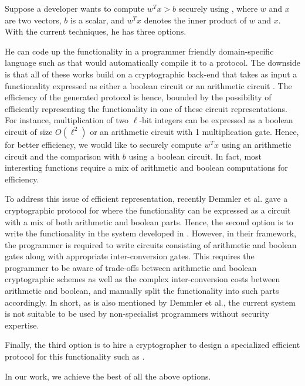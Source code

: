 Suppose a developer wants to compute $w^Tx >b$ securely using
\mpc, where $w$ and $x$ are two vectors, $b$ is a scalar, and $w^Tx$ denotes the inner product of $w$ and $x$.  With the current techniques, he has three options. 
\begin{tiret}
\item He can code up the functionality in a programmer friendly
  domain-specific language such as
  \cite{lambdaps,wysteria,oblivm,smcl,cbmcgc} that would automatically
  compile it to a \mpc protocol. The downside is that all of these
  works build on a cryptographic back-end that takes as input a functionality expressed as either a boolean circuit \cite{yao,gmw} or an arithmetic circuit \cite{homo}.
  The efficiency of the generated \mpc protocol is hence, bounded by the possibility of efficiently representing the functionality in one of these circuit representations. For instance, multiplication of two $\ell$-bit integers can be expressed as a boolean circuit of size  $O(\ell^2)$ or an arithmetic circuit with 1 multiplication gate. 
Hence, for better efficiency, we would like to securely compute $w^Tx$ using an arithmetic circuit and the comparison with $b$ using a boolean circuit. 
In fact, most interesting functions require a mix of arithmetic and boolean computations for efficiency.

\item To address this issue of efficient representation, recently Demmler et al. \cite{aby} gave a cryptographic protocol for \mpc where the functionality can be expressed as a circuit with a mix of both arithmetic and boolean parts.
Hence, the second option is to write the functionality in the system developed in \cite{aby}.
However, in their framework, the programmer is required to write circuits consisting of  arithmetic and boolean gates along with appropriate
inter-conversion gates.
This requires the programmer to be aware of
trade-offs between arithmetic and boolean cryptographic
schemes as well as the complex inter-conversion costs between arithmetic and boolean, and manually split the functionality into such parts accordingly.  
In short, as is also mentioned by Demmler et al., the current system  is not suitable
to be used by non-specialist programmers without security expertise.

\item Finally, the third option is to hire a cryptographer to design a specialized efficient protocol for this functionality such as \cite{shafindss,wu,minionn}. 
\end{tiret}
In our work, we achieve the best of all the above options. 




